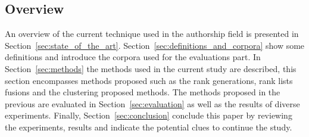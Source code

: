 \subsection{Overview}

An overview of the current technique used in the authorship field is presented in Section~\ref{sec:state_of_the_art}.
Section~\ref{sec:definitions_and_corpora} show some definitions and introduce the corpora used for the evaluations part.
In Section~\ref{sec:methods} the methods used in the current study are described, this section encompasses methods proposed such as the rank generations, rank lists fusions and the clustering proposed methods.
The methods proposed in the previous are evaluated in Section~\ref{sec:evaluation} as well as the results of diverse experiments.
Finally, Section~\ref{sec:conclusion} conclude this paper by reviewing the experiments, results and indicate the potential clues to continue the study.
